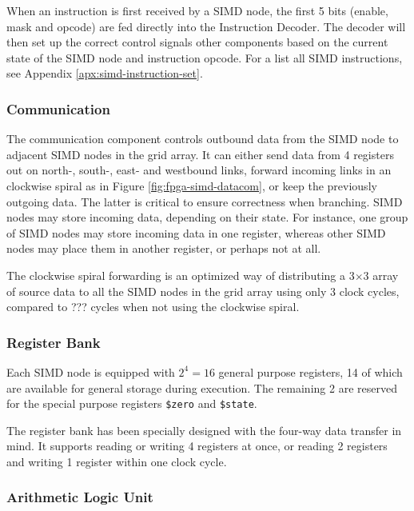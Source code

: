 When an instruction is first received by a \ac{SIMD} node, the first 5 bits
(enable, mask and opcode) are fed directly into the Instruction Decoder. The
decoder will then set up the correct control signals other components based on
the current state of the \ac{SIMD} node and instruction opcode. For a list all
\ac{SIMD} instructions, see Appendix \ref{apx:simd-instruction-set}.

\subsubsection{Communication}
The communication component controls outbound data from the \ac{SIMD} node to
adjacent \ac{SIMD} nodes in the grid array. It can either send data from 4
registers out on north-, south-, east- and westbound links, forward incoming
links in an clockwise spiral as in Figure \ref{fig:fpga-simd-datacom}, or keep
the previously outgoing data. The latter is critical to ensure correctness when
branching. \ac{SIMD} nodes may store incoming data, depending on their
state. For instance, one group of \ac{SIMD} nodes may store incoming data in one
register, whereas other \ac{SIMD} nodes may place them in another register, or
perhaps not at all.

The clockwise spiral forwarding is an optimized way of distributing a 3$\times$3
array of source data to all the \ac{SIMD} nodes in the grid array using only 3
clock cycles, compared to ??? cycles when not using the clockwise
spiral. 

\subsubsection{Register Bank}
Each \ac{SIMD} node is equipped with $2^4 = 16$ general purpose registers, 14 of
which are available for general storage during execution. The remaining 2 are
reserved for the special purpose registers {\tt \$zero} and {\tt \$state}.



The register bank has been specially designed with the four-way data transfer in
mind. It supports reading or writing 4 registers at once, or reading 2
registers and writing 1 register within one clock cycle.

\subsubsection{Arithmetic Logic Unit}

